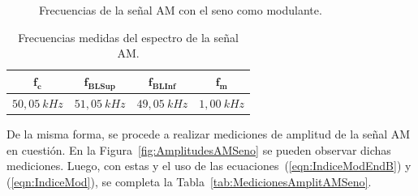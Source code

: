 \begin{figure}[H]
        \caption{Frecuencias de la señal AM con el seno como modulante.}
        \label{fig:FreqAMSeno}
      \end{figure}

      \begin{table}[H]
        \centering
      \begin{tabular}{cccc} \hline \hline
          $\mathbf{f_c} $        &   $\mathbf{f_{BLSup}}$   &   $\mathbf{f_{BLInf}}$    &   $\mathbf{f_m}$  \\ \hline
          $50,05~kHz$   &   $51,05~kHz$   &    $49,05~kHz$   &   $1,00~kHz$   \\ \hline \hline
        \end{tabular}
        \caption{Frecuencias medidas del espectro de la señal AM.}
        \label{tab:MedicionesFreqAMSeno}
      \end{table}

      De la misma forma, se procede a realizar mediciones de amplitud de la señal AM en cuestión. En la
      Figura~\ref{fig:AmplitudesAMSeno} se pueden observar dichas mediciones. Luego, con estas y 
      el uso de las ecuaciones~(\ref{eqn:IndiceModEndB}) y (\ref{eqn:IndiceMod}), se completa la 
      Tabla~\ref{tab:MedicionesAmplitAMSeno}.

